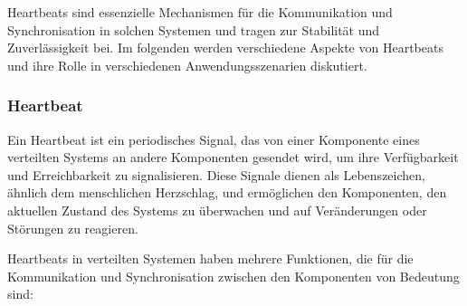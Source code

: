 Heartbeats sind essenzielle Mechanismen für die Kommunikation und Synchronisation in solchen Systemen und tragen zur Stabilität und Zuverlässigkeit bei. Im folgenden werden verschiedene Aspekte von Heartbeats und ihre Rolle in verschiedenen Anwendungsszenarien diskutiert. 

\subsubsection{Heartbeat}

Ein Heartbeat ist ein periodisches Signal, das von einer Komponente eines verteilten Systems an andere Komponenten gesendet wird, um ihre  Verfügbarkeit und Erreichbarkeit zu signalisieren. Diese Signale dienen als Lebenszeichen, ähnlich dem menschlichen Herzschlag, und ermöglichen den Komponenten, den aktuellen Zustand des Systems zu überwachen und auf Veränderungen oder Störungen zu reagieren.

Heartbeats in verteilten Systemen haben mehrere Funktionen, die für die Kommunikation und Synchronisation zwischen den Komponenten von Bedeutung sind:


